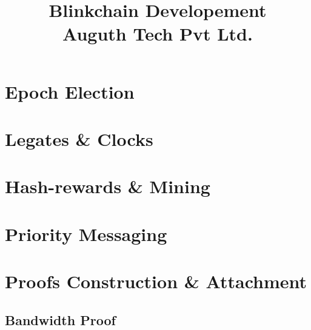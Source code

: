 \documentclass[a4paper,12pt]{article}
\title{
Blinkchain Developement\\
Auguth Tech Pvt Ltd.}
\date{\vspace{-5ex}}
\begin{document}
\maketitle

\section{Epoch Election}

\section{Legates \& Clocks}

\section{Hash-rewards \& Mining}

\section{Priority Messaging}

\section{Proofs Construction \& Attachment}
\subsection{Bandwidth Proof}
\end{document}
